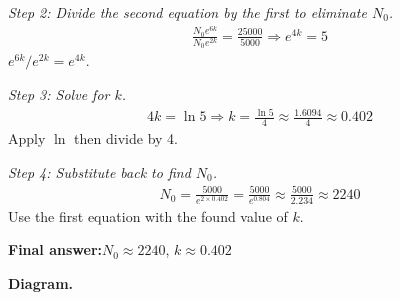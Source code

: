 \documentclass[11pt]{article}
\begin{document}
\textit{Step 2: Divide the second equation by the first to eliminate \( N_0 \).}
\[\begin{gathered}
\frac{N_0 e^{6k}}{N_0 e^{2k}} = \frac{25000}{5000} \Rightarrow e^{4k} = 5
\end{gathered}\]
\( e^{6k}/e^{2k} = e^{4k} \).

\textit{Step 3: Solve for \( k \).}
\[\begin{gathered}
4k = \ln 5 \Rightarrow k = \frac{\ln 5}{4} \approx \frac{1.6094}{4} \approx 0.402
\end{gathered}\]
Apply \( \ln \) then divide by 4.

\textit{Step 4: Substitute back to find \( N_0 \).}
\[\begin{gathered}
N_0 = \frac{5000}{e^{2 \times 0.402}} = \frac{5000}{e^{0.804}} \approx \frac{5000}{2.234} \approx 2240
\end{gathered}\]
Use the first equation with the found value of \( k \).

\begin{answerbox}
\textbf{Final answer:}\quad \(\displaystyle  N_0 \approx 2240 \), \(\displaystyle  k \approx 0.402 \)
\end{answerbox}
\textbf{Diagram.}
\end{document}
